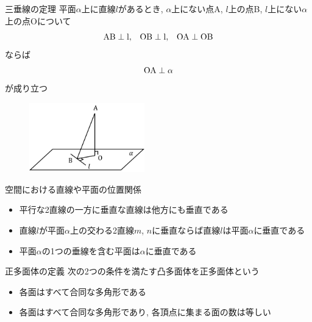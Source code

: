 \documentclass[aspectratio=169, 12pt]{beamer} %
\begin{document}
\begin{frame}{三垂線の定理}
    平面$\alpha$上に直線$l$があるとき, $\alpha$上にない点A, $l$上の点B, $l$上にない$\alpha$上の点Oについて
    \begin{eqnarray*}
        \rm{AB}\perp l, \;\;\;
        \rm{OB}\perp l, \;\;\;
        \rm{OA}\perp \rm{OB}
    \end{eqnarray*}
    ならば
    \begin{eqnarray*}
        \rm{OA}\perp \alpha
    \end{eqnarray*}
    が成り立つ
    \begin{figure}[htbp]
        \begin{center}
            \includegraphics[width=50mm]{fig/10.png}
        \end{center}
    \end{figure}
\end{frame}
\begin{frame}{空間における直線や平面の位置関係}
    \begin{itemize}
        \item 平行な2直線の一方に垂直な直線は他方にも垂直である
        \item 直線$l$が平面$\alpha$上の交わる2直線$m$, $n$に垂直ならば直線$l$は平面$\alpha$に垂直である
        \item 平面$\alpha$の1つの垂線を含む平面は$\alpha$に垂直である
    \end{itemize}
\end{frame}
\begin{frame}{正多面体の定義}
    次の2つの条件を満たす凸多面体を正多面体という
    \begin{itemize}
        \item 各面はすべて合同な多角形である
        \item 各面はすべて合同な多角形であり, 各頂点に集まる面の数は等しい
    \end{itemize}
\end{frame}
\end{document}
